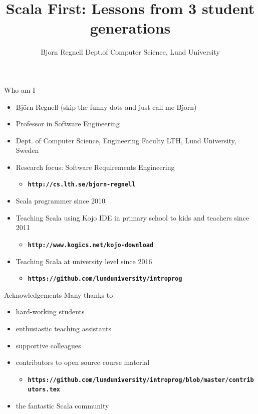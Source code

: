 \documentclass[aspectratio=169]{beamer}
\title[Scala First Lessons]{Scala First: \vspace{0.25em}\newline \fontsize{16}{25}\selectfont Lessons from 3 student generations }
\author[cs.lth.se/bjorn-regnell]{%
  Bjorn Regnell\newline
  Dept.\@ of Computer Science, Lund University}
\newcommand{\TitleSlide}{\begin{frame}[plain]\titlepage\end{frame}}
\newenvironment{Slide}[1]%
  {\begin{frame}[environment=Slide]{#1}}
  {\end{frame}}%
\begin{document}
\TitleSlide


\begin{Slide}{Who am I}
\begin{itemize}
\item Björn Regnell (skip the funny dots and just call me Bjorn)
\item Professor in Software Engineering
\item Dept. of Computer Science, Engineering Faculty LTH, Lund University, Sweden
\item Research focus: Software Requirements Engineering
\begin{itemize}
  \item \textbf{\texttt{http://cs.lth.se/bjorn-regnell}}  
\end{itemize}  
  
\item Scala programmer since 2010 
\item Teaching Scala using Kojo IDE in primary school to kids and teachers since 2011
\begin{itemize}
  \item \textbf{\texttt{http://www.kogics.net/kojo-download}}  
\end{itemize}  

\item Teaching Scala at university level since 2016
\begin{itemize}
  \item \textbf{\texttt{https://github.com/lunduniversity/introprog}}  
\end{itemize}  

\end{itemize}  


\end{Slide}

\begin{Slide}{Acknowledgements}
  Many thanks to
  \begin{itemize}
    \item hard-working students
    \item enthusiastic teaching assistants
    \item supportive colleagues
    \item contributors to open source course material
    \begin{itemize}
      \item \textbf{\fontsize{8}{12}\selectfont\texttt{https://github.com/lunduniversity/introprog/blob/master/contributors.tex}}      
    \end{itemize}
    \item the fantastic Scala community 
  \end{itemize}
\end{Slide}
\end{document}
